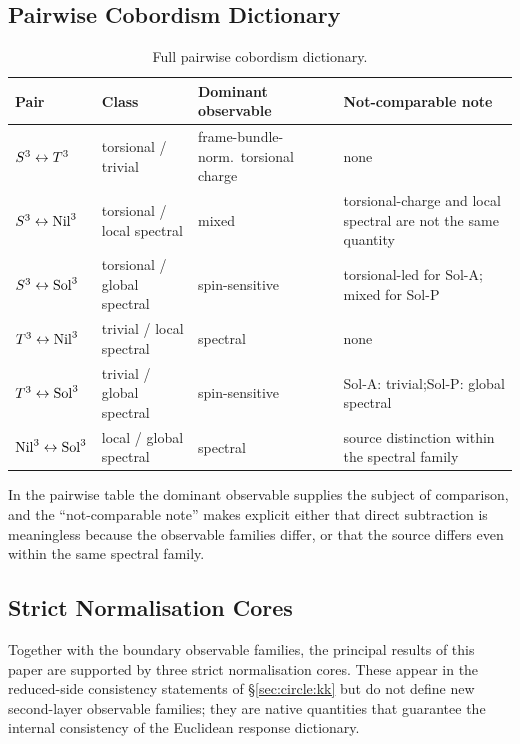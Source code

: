 \subsection{Pairwise Cobordism Dictionary}
\label{app:B:pairwise}

\begin{table}[H]
\centering\small
\begingroup
\renewcommand{\arraystretch}{1.5}
\begin{tabularx}{\linewidth}{lXXX}
\toprule
Pair & Class & Dominant observable & Not-comparable note \\
\midrule
$S^3 \leftrightarrow T^3$ & torsional / trivial & frame-bundle-norm.\ torsional charge & none \\
$S^3 \leftrightarrow \mathrm{Nil}^3$ & torsional / local spectral & mixed & torsional-charge and local spectral are not the same quantity \\
$S^3 \leftrightarrow \mathrm{Sol}^3$ & torsional / global spectral & spin-sensitive & torsional-led for Sol-A; mixed for Sol-P \\
$T^3 \leftrightarrow \mathrm{Nil}^3$ & trivial / local spectral & spectral & none \\
$T^3 \leftrightarrow \mathrm{Sol}^3$ & trivial / global spectral & spin-sensitive & Sol-A: trivial;\newline Sol-P: global spectral \\
$\mathrm{Nil}^3 \leftrightarrow \mathrm{Sol}^3$ & local / global spectral & spectral & source distinction within the spectral family \\
\bottomrule
\end{tabularx}
\endgroup
\caption{Full pairwise cobordism dictionary.}
\label{tab:appB_pairwise}
\end{table}

In the pairwise table the dominant observable supplies the subject of
comparison, and the ``not-comparable note'' makes explicit either that
direct subtraction is meaningless because the observable families differ,
or that the source differs even within the same spectral family.

\subsection{Strict Normalisation Cores}
\label{app:B:cores}

Together with the boundary observable families, the principal results of
this paper are supported by three strict normalisation cores.  These appear
in the reduced-side consistency statements of \S\ref{sec:circle:kk} but do
not define new second-layer observable families; they are native
quantities that guarantee the internal consistency of the Euclidean
response dictionary.

